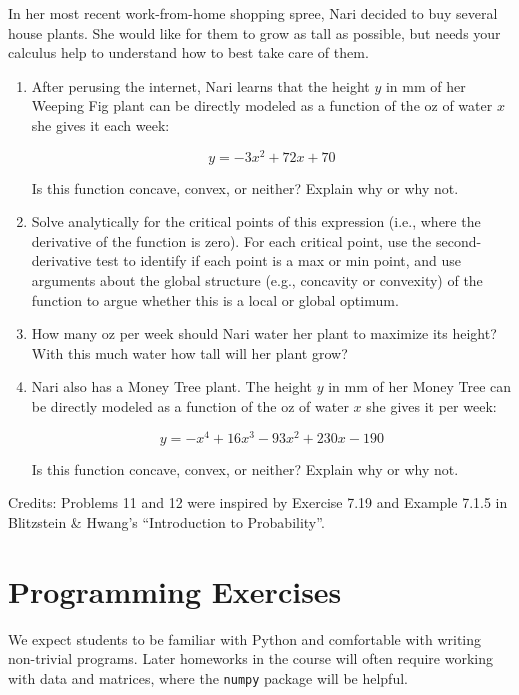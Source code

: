 \documentclass{harvardml}
\theoremstyle{definition}
\theoremstyle{plain}
\begin{document}
\begin{problem}
In her most recent work-from-home shopping spree, Nari decided to buy several house plants.  She would like for them to grow as tall as possible, but needs your calculus help to understand how to best take care of them.

\begin{enumerate} [label=(\alph*)] 
\item After perusing the internet, Nari learns that the height $y$ in mm of her Weeping Fig plant can be directly modeled as a function of the oz of water $x$ she gives it each week:

$$ y = - 3x^2 + 72x + 70$$

Is this function concave, convex, or neither?  Explain why or why not.

\item Solve analytically for the critical points of this expression (i.e., where the derivative of the function is zero).  For each critical point, use the second-derivative test to identify if each point is a  max or min point, and use arguments about the global structure (e.g., concavity or convexity) of the function to argue whether this is a local or global optimum. 

\item How many oz per week should Nari water her plant to maximize its height? With this much water how tall will her plant grow?

\item Nari also has a Money Tree plant.  The height $y$ in mm of her Money Tree can be directly modeled as a function of the oz of water $x$ she gives it per week:

$$ y = - x^4 + 16 x^3 - 93 x^2 + 230 x - 190$$

Is this function concave, convex, or neither?  Explain why or why not.

\end{enumerate}


\end{problem}

\noindent Credits:  Problems 11 and 12 were inspired by Exercise 7.19 and  Example 7.1.5 in Blitzstein \& Hwang's ``Introduction to Probability''.

\newpage

\section{Programming Exercises}
We expect students to be familiar with Python and comfortable with writing non-trivial programs. Later homeworks in the course will often require working with data and matrices, where the \verb|numpy| package will be helpful. \\
\end{document}
